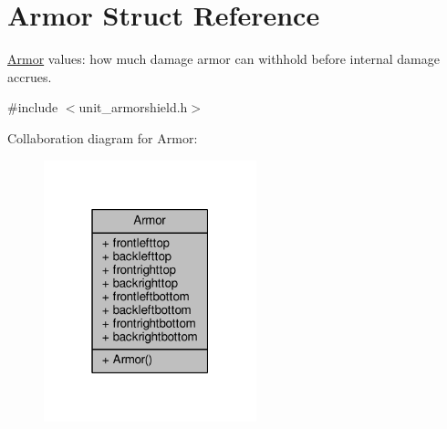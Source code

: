\hypertarget{structArmor}{}\section{Armor Struct Reference}
\label{structArmor}


\hyperlink{structArmor}{Armor} values\+: how much damage armor can withhold before internal damage accrues.  




{\ttfamily \#include $<$unit\+\_\+armorshield.\+h$>$}



Collaboration diagram for Armor\+:
\nopagebreak
\begin{figure}[H]
\begin{center}
\leavevmode
\includegraphics[width=175pt]{da/d91/structArmor__coll__graph}
\end{center}
\end{figure}
